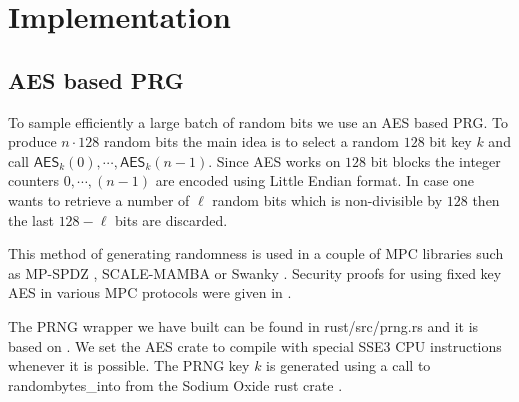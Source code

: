 \section{Implementation}

\subsection{AES based PRG}
\label{sec:aes}

To sample efficiently a large batch of random bits we use an AES based PRG.
To produce $n \cdot 128$ random bits the main idea is to select a random
$128$ bit key $k$ and call $\mathsf{AES}_k(0), \cdots, \mathsf{AES}_k(n-1)$.
Since AES works on $128$ bit blocks the integer counters $0, \cdots, (n-1)$
are encoded using Little Endian format.  In case one wants to retrieve a
number of $\ell$ random bits which is non-divisible by $128$ then the last
$128 - \ell$ bits are discarded.

This method of generating
randomness is used in a couple of MPC libraries such as MP-SPDZ
\cite{CCS:Keller20}, SCALE-MAMBA \cite{SCALE} or Swanky \cite{url-swanky}.
Security proofs for using fixed key AES in various MPC protocols were given
in \cite{SP:GKWY20}.

The PRNG wrapper we have built can be found in \textsf{rust/src/prng.rs} and
it is based on \cite{url-cargo-aes}.  We set the \textsf{AES} crate to
compile with special SSE3 CPU instructions whenever it is possible.
The PRNG key $k$ is generated using a call to \textsf{randombytes\_into}
from the Sodium Oxide rust crate \cite{url-sodiumoxide}.

